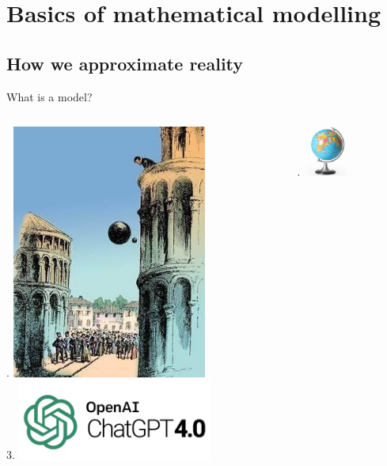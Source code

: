 \documentclass[mathserif,11pt]{beamer}
\begin{document}
\section{Basics of mathematical modelling}
\subsection{How we approximate reality}
\begin{frame}{What is a model?}
\centering
\begin{columns}
\begin{column}{0.5\textwidth}
. \includegraphics[width=0.7\textwidth]{Figures/galileo.jpg}\\
			3. \includegraphics[width=0.7\textwidth]{Figures/OpenAI_ChatGPT.png}\\
\end{column}
\begin{column}{0.5\textwidth}
.\includegraphics[width=0.5\textwidth]{Figures/globe.jpg}\\

\end{column}
\end{columns}
\end{frame}
\end{document}
